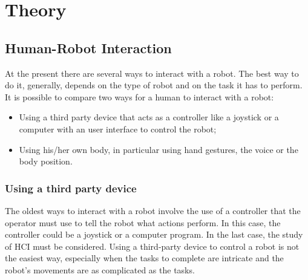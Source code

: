 \documentclass[../thesis.tex]{subfiles}
\begin{document}
\chapter{Theory}\label{cap:theory}

\section{Human-Robot Interaction}
At the present there are several ways to interact with a robot. The best way to do it, generally, depends on the type of robot and on the task it has to perform. It is possible to compare two ways for a human to interact with a robot:
\begin{itemize}
    \item Using a third party device that acts as a controller like a joystick or a computer with an user interface to control the robot;
    \item Using his/her own body, in particular using hand gestures, the voice or the body position.
\end{itemize}
\subsection{Using a third party device}
The oldest ways to interact with a robot involve the use of a controller that the operator must use to tell the robot what actions perform. In this case, the controller could be a joystick or a computer program. In the last case, the study of \acrfull{HCI} must be considered. Using a third-party device to control a robot is not the easiest way, especially when the tasks to complete are intricate and the robot's movements are as complicated as the tasks.  
\end{document}
